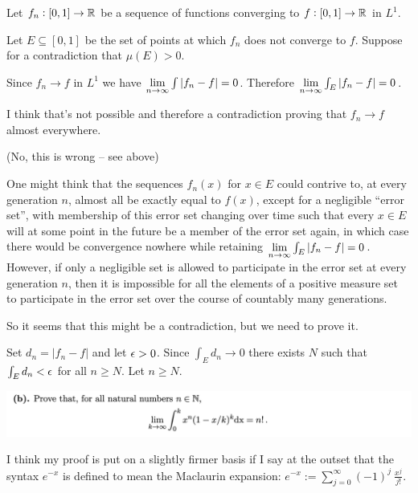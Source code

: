 
Let $f_n: [0, 1] \to \mathbb{R}$ be a sequence of functions converging to $f: [0, 1] \to \mathbb{R}$ in $L^1$.

Let $E \subseteq [0, 1]$ be the set of points at which $f_n$ does not converge to $f$. Suppose for a
contradiction that $\mu(E) > 0$.

Since $f_n \to f$ in $L^1$ we have $\limninf \int |f_n - f| = 0$. Therefore $\limninf \int_E |f_n - f| = 0$.

I think that's not possible and therefore a contradiction proving that $f_n \to f$ almost everywhere.

(No, this is wrong -- see above)

One might think that the sequences $f_n(x)$ for $x \in E$ could contrive to, at every
generation $n$, almost all be exactly equal to $f(x)$, except for a negligible ``error set​'', with
membership of this error set changing over time such that every $x \in E$ will at some point in the
future be a member of the error set again, in which case there would be convergence nowhere while
retaining $\limninf \int_E |f_n - f| = 0$. However, if only a negligible set is allowed to
participate in the error set at every generation $n$, then it is impossible for all the elements of
a positive measure set to participate in the error set over the course of countably many
generations.

So it seems that this might be a contradiction, but we need to prove it.

Set $d_n = |f_n - f|$ and let $\epsilon > 0$. Since $\int_E d_n \to 0$ there exists $N$ such
that $\int_E d_n < \epsilon$ for all $n \geq N$. Let $n \geq N$. 

\newpage
\begin{mdframed}
  \includegraphics[width=400pt]{img/analysis--berkeley-202a-final-96cc.png}
\end{mdframed}

I think my proof is put on a slightly firmer basis if I say at the outset that the syntax $e^{-x}$
is defined to mean the Maclaurin expansion: $e^{-x} := \sum_{j=0}^\infty (-1)^j ~ \frac{x^j}{j!}$.

